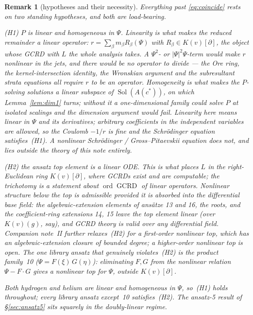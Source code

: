 \documentclass[11pt]{article}
\DeclareMathOperator{\Sol}{Sol}
\DeclareMathOperator{\GCRD}{GCRD}
\DeclareMathOperator{\ord}{ord}
\newtheorem{remark}{Remark}
\begin{document}
\begin{remark}[hypotheses and their necessity]
\label{rem:hyp}
Everything past \eqref{eq:coincide} rests on two standing hypotheses, and both
are load-bearing.

\emph{(H1) $P$ is linear and homogeneous in $\Psi$.} Linearity is what makes
the reduced remainder a \emph{linear} operator: $r=\sum_\beta m_\beta
R_\beta(\Psi)$ with $R_\beta\in K(v)[\partial]$, the object whose GCRD with $L$
the whole analysis takes. A $\Psi^2$- or $|\Psi|^2\Psi$-term would make $r$
nonlinear in the jets, and there would be no operator to divide --- the Ore
ring, the kernel-intersection identity, the Wronskian argument and the
subresultant strata equations all require $r$ to be an operator. Homogeneity is
what makes the $P$-solving solutions a linear \emph{subspace} of
$\Sol(A(c^*))$, on which Lemma~\ref{lem:dim1} turns; without it a
one-dimensional family could solve $P$ at isolated scalings and the dimension
argument would fail. Linearity here means linear in $\Psi$ and its
derivatives; arbitrary coefficients in the independent variables are allowed,
so the Coulomb $-1/r$ is fine and the Schr\"odinger equation satisfies~(H1). A
nonlinear Schr\"odinger / Gross--Pitaevskii equation does not, and lies outside
the theory of this note entirely.

\emph{(H2) the ansatz top element is a linear ODE.} This is what places $L$ in
the right-Euclidean ring $K(v)[\partial]$, where GCRDs exist and are
computable; the trichotomy is a statement about $\ord\GCRD$ of linear
operators. Nonlinear structure \emph{below} the top is admissible provided it
is absorbed into the differential base field: the algebraic-extension elements
of ans\"atze 13 and 16, the roots, and the coefficient-ring extensions 14, 15
leave the top element linear (over $K(v)(g)$, say), and GCRD theory is valid
over any differential field. Companion note~II further relaxes~(H2) for a
\emph{first-order} nonlinear top, which has an algebraic-extension closure of
bounded degree; a \emph{higher-order} nonlinear top is open. The one library
ansatz that genuinely violates~(H2) is the product family~10
($\Psi=F(\xi)\,G(\eta)$): eliminating $F,G$ from the nonlinear relation
$\Psi-F\!\cdot\!G$ gives a nonlinear top for $\Psi$, outside $K(v)[\partial]$.

Both hydrogen and helium are linear and homogeneous in $\Psi$, so~(H1) holds
throughout; every library ansatz except~10 satisfies~(H2). The
ansatz-5 result of \S\ref{sec:ansatz5} sits squarely in the doubly-linear
regime.
\end{remark}
\end{document}
